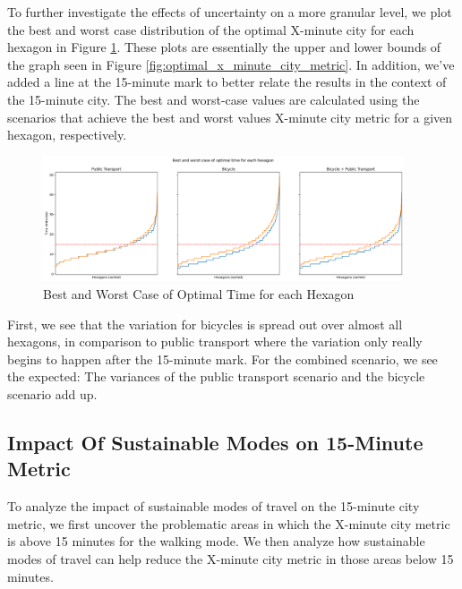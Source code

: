 To further investigate the effects of uncertainty on a more granular level, we plot the best and worst case distribution of the optimal X-minute city for each hexagon in Figure \ref{fig:best_and_worst_case_of_optimal_time_for_each_hexagon}.
These plots are essentially the upper and lower bounds of the graph seen in Figure \ref{fig:optimal_x_minute_city_metric}.
In addition, we've added a line at the 15-minute mark to better relate the results in the context of the 15-minute city.
The best and worst-case values are calculated using the scenarios that achieve the best and worst values X-minute city metric for a given hexagon, respectively.
\begin{figure}
  \begin{center}
    \includegraphics[width=0.95\textwidth]{Figures/results/uncertainty/optimal_best_worst_case}
  \end{center}
  \caption{Best and Worst Case of Optimal Time for each Hexagon}
  \label{fig:best_and_worst_case_of_optimal_time_for_each_hexagon}
\end{figure}
First, we see that the variation for bicycles is spread out over almost all hexagons, in comparison to public transport where the variation only really begins to happen after the 15-minute mark.
For the combined scenario, we see the expected: The variances of the public transport scenario and the bicycle scenario add up.

\subsection{Impact Of Sustainable Modes on 15-Minute Metric}
\label{subsec:impact_of_sustainable_modes_on_15_minute_metric}

To analyze the impact of sustainable modes of travel on the 15-minute city metric, we first uncover the problematic areas in which the X-minute city metric is above 15 minutes for the walking mode.
We then analyze how sustainable modes of travel can help reduce the X-minute city metric in those areas below 15 minutes.

